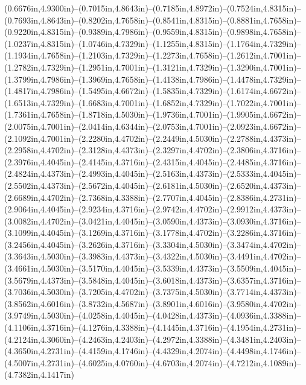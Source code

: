 (0.6676in,4.9300in)--(0.7015in,4.8643in)--(0.7185in,4.8972in)--(0.7524in,4.8315in)--(0.7693in,4.8643in)--(0.8202in,4.7658in)--(0.8541in,4.8315in)--(0.8881in,4.7658in)--(0.9220in,4.8315in)--(0.9389in,4.7986in)--(0.9559in,4.8315in)--(0.9898in,4.7658in)--(1.0237in,4.8315in)--(1.0746in,4.7329in)--(1.1255in,4.8315in)--(1.1764in,4.7329in)--(1.1934in,4.7658in)--(1.2103in,4.7329in)--(1.2273in,4.7658in)--(1.2612in,4.7001in)--(1.2782in,4.7329in)--(1.2951in,4.7001in)--(1.3121in,4.7329in)--(1.3290in,4.7001in)--(1.3799in,4.7986in)--(1.3969in,4.7658in)--(1.4138in,4.7986in)--(1.4478in,4.7329in)--(1.4817in,4.7986in)--(1.5495in,4.6672in)--(1.5835in,4.7329in)--(1.6174in,4.6672in)--(1.6513in,4.7329in)--(1.6683in,4.7001in)--(1.6852in,4.7329in)--(1.7022in,4.7001in)--(1.7361in,4.7658in)--(1.8718in,4.5030in)--(1.9736in,4.7001in)--(1.9905in,4.6672in)--(2.0075in,4.7001in)--(2.0414in,4.6344in)--(2.0753in,4.7001in)--(2.0923in,4.6672in)--(2.1092in,4.7001in)--(2.2280in,4.4702in)--(2.2449in,4.5030in)--(2.2788in,4.4373in)--(2.2958in,4.4702in)--(2.3128in,4.4373in)--(2.3297in,4.4702in)--(2.3806in,4.3716in)--(2.3976in,4.4045in)--(2.4145in,4.3716in)--(2.4315in,4.4045in)--(2.4485in,4.3716in)--(2.4824in,4.4373in)--(2.4993in,4.4045in)--(2.5163in,4.4373in)--(2.5333in,4.4045in)--(2.5502in,4.4373in)--(2.5672in,4.4045in)--(2.6181in,4.5030in)--(2.6520in,4.4373in)--(2.6689in,4.4702in)--(2.7368in,4.3388in)--(2.7707in,4.4045in)--(2.8386in,4.2731in)--(2.9064in,4.4045in)--(2.9234in,4.3716in)--(2.9742in,4.4702in)--(2.9912in,4.4373in)--(3.0082in,4.4702in)--(3.0421in,4.4045in)--(3.0590in,4.4373in)--(3.0930in,4.3716in)--(3.1099in,4.4045in)--(3.1269in,4.3716in)--(3.1778in,4.4702in)--(3.2286in,4.3716in)--(3.2456in,4.4045in)--(3.2626in,4.3716in)--(3.3304in,4.5030in)--(3.3474in,4.4702in)--(3.3643in,4.5030in)--(3.3983in,4.4373in)--(3.4322in,4.5030in)--(3.4491in,4.4702in)--(3.4661in,4.5030in)--(3.5170in,4.4045in)--(3.5339in,4.4373in)--(3.5509in,4.4045in)--(3.5679in,4.4373in)--(3.5848in,4.4045in)--(3.6018in,4.4373in)--(3.6357in,4.3716in)--(3.7036in,4.5030in)--(3.7205in,4.4702in)--(3.7375in,4.5030in)--(3.7714in,4.4373in)--(3.8562in,4.6016in)--(3.8732in,4.5687in)--(3.8901in,4.6016in)--(3.9580in,4.4702in)--(3.9749in,4.5030in)--(4.0258in,4.4045in)--(4.0428in,4.4373in)--(4.0936in,4.3388in)--(4.1106in,4.3716in)--(4.1276in,4.3388in)--(4.1445in,4.3716in)--(4.1954in,4.2731in)--(4.2124in,4.3060in)--(4.2463in,4.2403in)--(4.2972in,4.3388in)--(4.3481in,4.2403in)--(4.3650in,4.2731in)--(4.4159in,4.1746in)--(4.4329in,4.2074in)--(4.4498in,4.1746in)--(4.5007in,4.2731in)--(4.6025in,4.0760in)--(4.6703in,4.2074in)--(4.7212in,4.1089in)--(4.7382in,4.1417in) 